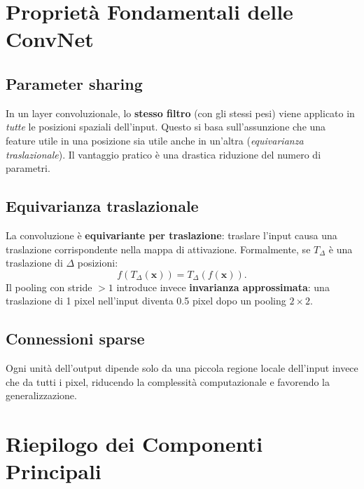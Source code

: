\section{Proprietà Fondamentali delle ConvNet}
\label{sec:cnn-properties}

\subsection{Parameter sharing}
\label{subsec:param-sharing}

In un layer convoluzionale, lo \textbf{stesso filtro} (con gli stessi pesi) viene applicato
in \emph{tutte} le posizioni spaziali dell'input. Questo si basa sull'assunzione che una
feature utile in una posizione sia utile anche in un'altra (\emph{equivarianza
traslazionale}). Il vantaggio pratico è una drastica riduzione del numero di parametri.

\subsection{Equivarianza traslazionale}
\label{subsec:equivariance}

La convoluzione è \textbf{equivariante per traslazione}: traslare l'input causa una
traslazione corrispondente nella mappa di attivazione. Formalmente, se $T_\Delta$ è una
traslazione di $\Delta$ posizioni:
\begin{equation}
  f(T_\Delta(\mathbf{x})) = T_\Delta(f(\mathbf{x})).
  \label{eq:equivariance}
\end{equation}
Il pooling con stride $> 1$ introduce invece \textbf{invarianza approssimata}: una
traslazione di 1 pixel nell'input diventa 0.5 pixel dopo un pooling $2\times2$.

\subsection{Connessioni sparse}
\label{subsec:sparse-conn}

Ogni unità dell'output dipende solo da una piccola regione locale dell'input invece che da
tutti i pixel, riducendo la complessità computazionale e favorendo la generalizzazione.

\section{Riepilogo dei Componenti Principali}
\label{sec:cnn-summary}

